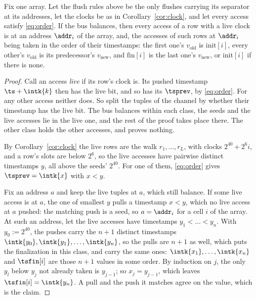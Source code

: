 \begin{theorem}\label{thm:rwmem}
Fix one array. Let the flush rules above be the only flushes carrying its separator at its addresses, let the clocks be as in Corollary~\ref{cor:clock}, and let every access satisfy \eqref{eq:order}. If the bus balances, then every access of a row with a live clock is at an address $\addr_i$ of the array, and, the accesses of such rows at $\addr_i$ being taken in the order of their timestamps: the first one's $v_{\mathrm{old}}$ is $\mathrm{init}[i]$, every other's $v_{\mathrm{old}}$ is its predecessor's $v_{\mathrm{new}}$, and $\mathrm{fin}[i]$ is the last one's $v_{\mathrm{new}}$, or $\mathrm{init}[i]$ if there is none.
\end{theorem}

\begin{proof}
Call an access \emph{live} if its row's clock is. Its pushed timestamp $\ts+\intk{k}$ then has the live bit, and so has its $\tsprev$, by \eqref{eq:order}. For any other access neither does. So split the tuples of the channel by whether their timestamp has the live bit. The bus balances within each class, the seeds and the live accesses lie in the live one, and the rest of the proof takes place there. The other class holds the other accesses, and proves nothing.

By Corollary~\ref{cor:clock} the live rows are the walk $r_1,\dots,r_L$, with clocks $2^{40}+2^{6}i$, and a row's slots are below $2^{6}$, so the live accesses have pairwise distinct timestamps $y$, all above the seeds' $2^{40}$. For one of them, \eqref{eq:order} gives $\tsprev=\intk{x}$ with $x<y$.

Fix an address $a$ and keep the live tuples at $a$, which still balance. If some live access is at $a$, the one of smallest $y$ pulls a timestamp $x<y$, which no live access at $a$ pushed: the matching push is a seed, so $a=\addr_i$ for a cell $i$ of the array. At such an address, let the live accesses have timestamps $y_1<\dots<y_n$. With $y_0:=2^{40}$, the pushes carry the $n+1$ distinct timestamps $\intk{y_0},\intk{y_1},\dots,\intk{y_n}$, so the pulls are $n+1$ as well, which puts the finalization in this class, and carry the same ones: $\intk{x_1},\dots,\intk{x_n}$ and $\tsfin[i]$ are those $n+1$ values in some order. By induction on $j$, the only $y_l$ below $y_j$ not already taken is $y_{j-1}$; so $x_j=y_{j-1}$, which leaves $\tsfin[i]=\intk{y_n}$. A pull and the push it matches agree on the value, which is the claim.
\end{proof}

